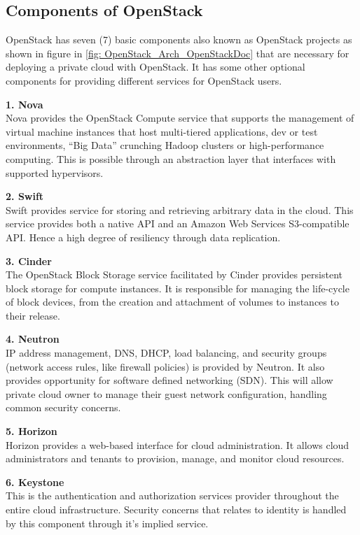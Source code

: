 \subsection{Components of OpenStack}
OpenStack has seven (7) basic components also known as OpenStack projects \cite{OpenStackBlog} as shown in figure in \ref{fig: OpenStack_Arch_OpenStackDoc} that are necessary for deploying a private cloud with OpenStack. It has some other optional components for providing different services for OpenStack users.

\textbf{1. Nova} \\
Nova provides the OpenStack Compute service that supports the management of virtual machine instances that host multi-tiered applications, dev or test environments, “Big Data” crunching Hadoop clusters or high-performance computing. This is possible through an abstraction layer that interfaces with supported hypervisors.

\textbf{2. Swift} \\
Swift provides service for storing and retrieving arbitrary data in the cloud. This service provides both a native API and an Amazon Web Services S3-compatible API. Hence a high degree of resiliency through data replication.

\textbf{3. Cinder} \\
The OpenStack Block Storage service facilitated by Cinder provides persistent block storage for compute instances. It is responsible for managing the life-cycle of block devices, from the creation and attachment of volumes to instances to their release.

\textbf{4. Neutron} \\
IP address management, DNS, DHCP, load balancing, and security groups (network access rules, like firewall policies) is provided by Neutron. It also provides opportunity for software defined networking (SDN). This will allow private cloud owner to manage their guest network configuration, handling common security concerns.

\textbf{5. Horizon} \\
Horizon provides a web-based interface for cloud administration. It allows cloud administrators and tenants to provision, manage, and monitor cloud resources. 

\textbf{6. Keystone} \\
This is the authentication and authorization services provider throughout the entire cloud infrastructure. Security concerns that relates to identity is handled by this component through it's implied service.

